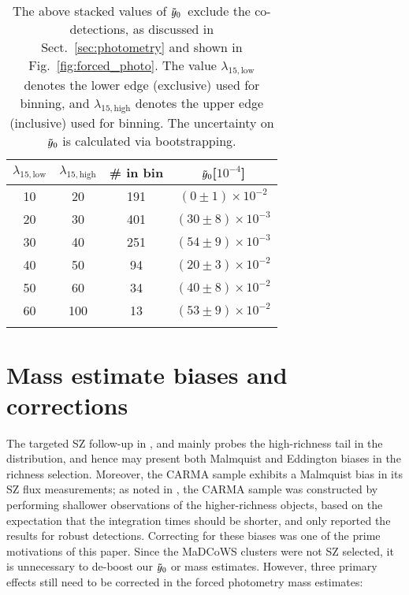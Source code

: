 \documentclass[longauth]{aa} %
\newcommand{\madcows}{MaDCoWS\xspace}
\newcommand{\yc}{$\Tilde{\vary}_0$\xspace}
\begin{document}
\begin{table}[]
    \centering    
    \caption{Stacks of \yc\ values for the \madcows cluster candidates.}
    \begin{tabular}{cccc}
    \hline\hline\noalign{\smallskip}
        $\lambda_{15,\text{low}}$  & $\lambda_{15,\text{high}}$  & \# in bin & \yc [$10^{-4}$]\\
        \hline
        10 & 20 & 191 & $(0 \pm 1) \times 10^{-2}$ \\
        20 & 30 & 401 & $(30 \pm 8)\times 10^{-3}$\\
        30 & 40 & 251 & $(54 \pm 9)\times 10^{-3}$\\
        40 & 50 & 94 & $(20 \pm 3)\times 10^{-2}$\\
        50 & 60 & 34 & $(40 \pm 8)\times 10^{-2}$\\
        60 & 100 & 13 & $(53 \pm 9)\times 10^{-2}$\\
    \noalign{\smallskip}
    \hline
    \end{tabular}
    \label{tab:stacks}
    \caption*{The above stacked values of \yc\ exclude the co-detections, as discussed in Sect.~\ref{sec:photometry} and shown in Fig.~\ref{fig:forced_photo}. The value $\lambda_{15,\text{low}}$ denotes the lower edge (exclusive) used for binning, and $\lambda_{15,\text{high}}$ denotes the upper edge (inclusive) used for binning. The uncertainty on \yc is calculated via bootstrapping.}
\end{table}




\section{Mass estimate biases and corrections}\label{sec:baises}

The targeted SZ follow-up in  \cite{Gonzalez2019}, \cite{DiMascolo2020} and \cite{Dicker2020} mainly probes the high-richness tail in the distribution, and hence may present both Malmquist and Eddington biases \citep[see e.g.,][]{Malmquist1922,Kelly2007} in the richness selection. Moreover, the CARMA sample exhibits a Malmquist bias in its SZ flux measurements; as noted in \cite{Gonzalez2019}, the CARMA sample was constructed by performing shallower observations of the higher-richness objects, based on the expectation that the integration times should be shorter, and only reported the results for robust detections. Correcting for these biases was one of the prime motivations of this paper. Since the MaDCoWS clusters were not SZ selected, it is unnecessary to  de-boost our \yc or mass estimates. However, three primary effects still need to be corrected in the forced photometry mass estimates:
\end{document}
